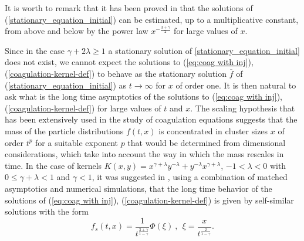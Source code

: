 \documentclass[11pt]{article}
\numberwithin{equation}{section}
\theoremstyle{plain}
\begin{document}
It is worth to remark that it has been proved in \cite{ferreira2019stationary} that the solutions of  (\ref{stationary_equation_initial}) can be estimated, up to a multiplicative constant, from above and below by the power law $x^{- \frac{3+\gamma }{2}}$ for large values of $x$.

Since in the case $\gamma + 2 \lambda \geq 1 $ a stationary solution of \eqref{stationary_equation_initial} does not exist, we cannot expect the solutions to (\ref{eq:coag with inj}), (\ref{coagulation-kernel-def}) to behave as the stationary solution $\overline{f}$ of
(\ref{stationary_equation_initial}) as $t\rightarrow\infty$ for $x$ of order one. 
It is then natural to ask what is the long time asymptotics of the solutions
to (\ref{eq:coag with inj}), (\ref{coagulation-kernel-def}) for large values of $t$ and $x.$ The scaling hypothesis that has been extensively used in the study of coagulation equations suggests that the mass of the particle distributions $f\left(t,x\right)$ is concentrated in cluster sizes $x$ of order $t^{p}$ for a suitable exponent $p$ that would be determined from dimensional considerations, which take into account the way in which the mass rescales in time. In the case of kernels $K\left(  x,y\right)=x^{\gamma + \lambda }y^{-\lambda}+y^{-\lambda}x^{\gamma + \lambda }$, $ -1 <  \lambda <0$ with $0\leq\gamma + \lambda<1$ and $\gamma <1$, it was suggested in \cite{davies1999smoluchowski}, using a combination of matched asymptotics and
numerical simulations, that the long time behavior of the solutions of (\ref{eq:coag with inj}), (\ref{coagulation-kernel-def}) is given by self-similar solutions with the form
\begin{equation}
f_s\left(  t,x\right)  =\frac{1}{t^{\frac{3+\gamma  }{1-\gamma}}}\Phi\left(
\xi \right)  \ ,\ \ \xi=\frac{x}{t^{\frac
{2}{1-\gamma }}}. \label{SelfSimFormOther}
\end{equation}
\end{document}

